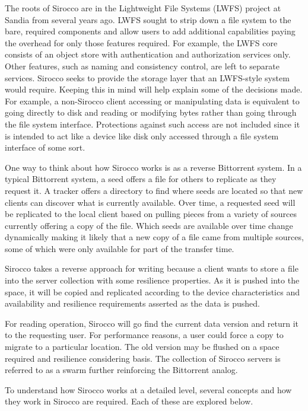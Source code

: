 The roots of Sirocco are in the Lightweight File Systems (LWFS) project at
Sandia from several years ago. LWFS sought to strip down a file system to the
bare, required components and allow users to add additional capabilities paying
the overhead for only those features required. For example, the LWFS core
consists of an object store with authentication and authorization services
only. Other features, such as naming and consistency control, are left to
separate services. Sirocco seeks to provide the storage layer that an
LWFS-style system would require. Keeping this in mind will help explain some of
the decisions made. For example, a non-Sirocco client accessing or manipulating
data is equivalent to going directly to disk and reading or modifying bytes
rather than going through the file system interface. Protections against such
access are not included since it is intended to act like a device like disk
only accessed through a file system interface of some sort.

One way to think about how Sirocco works is as a reverse Bittorrent system. In
a typical Bittorrent system, a seed offers a file for others to replicate as
they request it. A tracker offers a directory to find where seeds are located
so that new clients can discover what is currently available. Over time, a
requested seed will be replicated to the local client based on pulling pieces
from a variety of sources currently offering a copy of the file. Which seeds
are available over time change dynamically making it likely that a new copy of
a file came from multiple sources, some of which were only available for part
of the transfer time.

Sirocco takes a reverse approach for writing because a client wants to store a
file into the server collection with some resilience properties. As it is
pushed into the space, it will be copied and replicated according to the device
characteristics and availability and resilience requirements asserted as the
data is pushed.

For reading operation, Sirocco will go find the current data version and return
it to the requesting user. For performance reasons, a user could force a copy
to migrate to a particular location. The old version may be flushed on a space
required and resilience considering basis. The collection of Sirocco servers is
referred to as a swarm further reinforcing the Bittorrent analog.

To understand how Sirocco works at a detailed level, several concepts and how
they work in Sirocco are required. Each of these are explored below.

